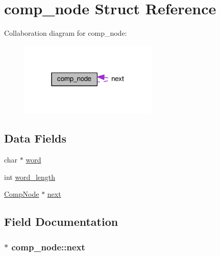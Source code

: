 \hypertarget{structcomp__node}{}\section{comp\+\_\+node Struct Reference}
\label{structcomp__node}


Collaboration diagram for comp\+\_\+node\+:\nopagebreak
\begin{figure}[H]
\begin{center}
\leavevmode
\includegraphics[width=187pt]{structcomp__node__coll__graph}
\end{center}
\end{figure}
\subsection*{Data Fields}
\begin{DoxyCompactItemize}
\item 
char $\ast$ \hyperlink{structcomp__node_a087b822f301956dd57ff59bf5d9ce9a4}{word}
\item 
int \hyperlink{structcomp__node_ab0e205b1c196f493851ae425e904c59b}{word\+\_\+length}
\item 
\hyperlink{linedit_8c_aa67e449f274e66ffe693e5dd32615d2a}{Comp\+Node} $\ast$ \hyperlink{structcomp__node_aa91fd30c56bcfb19162045c7856d66c8}{next}
\end{DoxyCompactItemize}


\subsection{Field Documentation}
\subsubsection[{\texorpdfstring{next}{next}}]{$\ast$ comp\+\_\+node\+::next}\hypertarget{structcomp__node_aa91fd30c56bcfb19162045c7856d66c8}{}\label{structcomp__node_aa91fd30c56bcfb19162045c7856d66c8}
